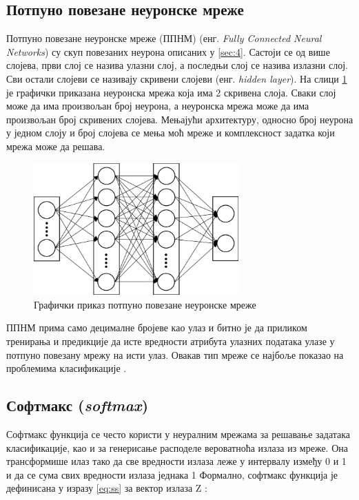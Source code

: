 \documentclass[a4paper, 12pt, master, utf8]{etf}
\begin{document}
\subsection{Потпуно повезане неуронске мреже}
\label{sec:41}

Потпуно повезане неуронске мреже (ППНМ) (енг. \textit{Fully Connected Neural Networks}) су скуп повезаних неурона описаних у \ref{sec:4}. 
Састоји се од више слојева, први слој се назива улазни слој, а последњи слој се назива излазни слој. 
Сви остали слојеви се називају скривени слојеви (енг. \textit{hidden layer}). 
На слици \ref{fig:fc} је графички приказана неуронска мрежа која има 2 скривена слоја.
Сваки слој може да има произвољан број неурона, а неуронска мрежа може да има произвољан број скривених слојева. 
Мењајући архитектуру, односно број неурона у једном слоју и број слојева се мења моћ мреже и комплексност задатка који мрежа може да решава.

\begin{figure}[h]
    \centering
    \includegraphics[width=0.7\textwidth]{images/fc.png}
    \caption{Графички приказ потпуно повезане неуронске мреже \cite{anwar_learned_2017}}
    \label{fig:fc}
\end{figure}

ППНМ прима само децималне бројеве као улаз и битно је да приликом тренирања и предикције да исте вредности атрибута улазних података улазе у потпуно повезану мрежу на исти улаз.
Овакав тип мреже се најбоље показао на проблемима класификације \cite{noauthor_artificial_2023}.

\subsection{Софтмакс (\textit{softmax})}

Софтмакс функција се често користи у неуралним мрежама за решавање задатака класификације, као и за генерисање расподеле вероватноћа излаза из мреже. 
Она трансформише илаз тако да све вредности излаза леже у интервалу између 0 и 1 и да се сума свих вредности излаза једнака 1 
Формално, софтмакс функција је дефинисана у изразу \ref{eq:ss} за вектор излаза Z :
\end{document}

